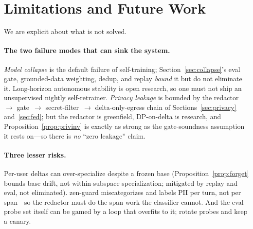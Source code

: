 \documentclass[11pt]{article}
\begin{document}
\section{Limitations and Future Work}
\label{sec:limits}

We are explicit about what is not solved.

\paragraph{The two failure modes that can sink the system.}
\emph{Model collapse} is the default failure of self-training; Section~\ref{sec:collapse}'s eval gate, grounded-data weighting, dedup, and replay \emph{bound} it but do not eliminate it. Long-horizon autonomous stability is open research, so one must not ship an unsupervised nightly self-retrainer. \emph{Privacy leakage} is bounded by the redactor~$\to$ gate~$\to$ secret-filter~$\to$ delta-only-egress chain of Sections~\ref{sec:privacy} and~\ref{sec:fed}; but the redactor is greenfield, DP-on-delta is research, and Proposition~\ref{prop:privinv} is exactly as strong as the gate-soundness assumption it rests on---so there is \emph{no} ``zero leakage'' claim.

\paragraph{Three lesser risks.}
Per-user deltas can over-specialize despite a frozen base (Proposition~\ref{prop:forget} bounds base drift, not within-subspace specialization; mitigated by replay and eval, not eliminated). zen-guard miscategorizes and labels PII per turn, not per span---so the redactor must do the span work the classifier cannot. And the eval probe set itself can be gamed by a loop that overfits to it; rotate probes and keep a canary.
\end{document}
